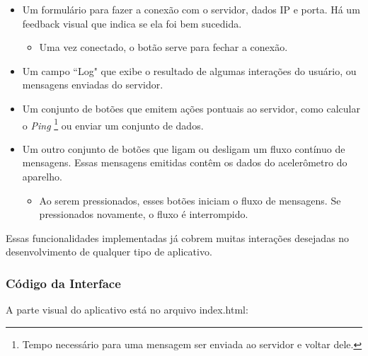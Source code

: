 \documentclass[a4paper,12pt]{article}
\begin{document}
\begin{itemize}
\item Um formulário para fazer a conexão com o servidor, dados IP e porta. Há um feedback visual que indica se ela foi bem sucedida.

\begin{itemize}
\item Uma vez conectado, o botão serve para fechar a conexão.
\end{itemize}

\item Um campo “Log" que exibe o resultado de algumas interações do usuário, ou mensagens enviadas do servidor.

\item Um conjunto de botões que emitem ações pontuais ao servidor, como calcular o \emph{Ping} \footnote{Tempo necessário para uma mensagem ser enviada ao servidor e voltar dele.} ou enviar um conjunto de dados.

\item Um outro conjunto de botões que ligam ou desligam um fluxo contínuo de mensagens. Essas mensagens emitidas contêm os dados do acelerômetro do aparelho.

\begin{itemize}
\item Ao serem pressionados, esses botões iniciam o fluxo de mensagens. Se pressionados novamente, o fluxo é interrompido.
\end{itemize}

\end{itemize}

Essas funcionalidades implementadas já cobrem muitas interações desejadas no desenvolvimento de qualquer tipo de aplicativo.


\subsubsection{Código da Interface}
A parte visual do aplicativo está no arquivo index.html:
\end{document}
